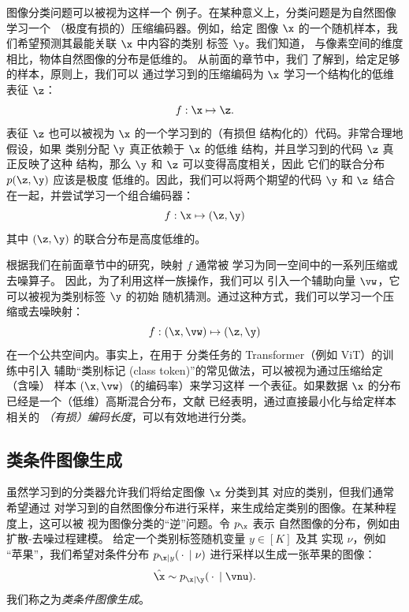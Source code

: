 \documentclass[../../book-main_zh.tex]{subfiles}
\begin{document}
图像分类问题可以被视为这样一个
例子。在某种意义上，分类问题是为自然图像学习一个
（极度有损的）压缩编码器。例如，给定
图像 $\x$ 的一个随机样本，我们希望预测其最能关联 $\x$ 中内容的类别
标签 $\y$。我们知道，
与像素空间的维度相比，物体自然图像的分布是低维的。
从前面的章节中，我们
了解到，给定足够的样本，原则上，我们可以
通过学习到的压缩编码为 $\x$ 学习一个结构化的低维表征 $\z$：
\begin{equation}
    f: \x \mapsto \z.
\end{equation}
表征 $\z$ 也可以被视为 $\x$ 的一个学习到的（有损但
结构化的）代码。非常合理地假设，如果
类别分配 $\y$ 真正依赖于 $\x$ 的低维
结构，并且学习到的代码 $\z$ 真正反映了这种
结构，那么 $\y$ 和 $\z$ 可以变得高度相关，因此
它们的联合分布 $p(\z, \y)$ 应该是极度
低维的。因此，我们可以将两个期望的代码 $\y$
和 $\z$ 结合在一起，并尝试学习一个组合编码器：
\begin{equation}
    f: \x \mapsto (\z, \y)
\end{equation}
其中 $(\z, \y)$ 的联合分布是高度低维的。

根据我们在前面章节中的研究，映射 $f$ 通常被
学习为同一空间中的一系列压缩或去噪算子。
因此，为了利用这样一族操作，我们可以
引入一个辅助向量 $\vw$，它可以被视为类别标签 $\y$ 的初始
随机猜测。通过这种方式，我们可以学习一个压缩或去噪映射：
\begin{equation}\label{eq:classifier-with-class-token}
    f: (\x, \vw) \mapsto (\z, \y)
\end{equation}
在一个公共空间内。事实上，在用于
分类任务的 Transformer（例如 ViT）的训练中引入
辅助“类别标记 (class token)”的常见做法，可以被视为通过压缩给定（含噪）
样本 $(\x, \vw)$（的编码率）来学习这样
一个表征。如果数据 $\x$ 的分布
已经是一个（低维）高斯混合分布，文献
\cite{wright2008classification} 已经表明，通过直接最小化与给定样本相关的
{\em （有损）编码长度}，可以有效地进行分类。

\subsection{类条件图像生成}\label{sub:cfg}
虽然学习到的分类器允许我们将给定图像 $\x$ 分类到其
对应的类别，但我们通常希望通过
对学习到的自然图像分布进行采样，来生成给定类别的图像。在某种程度上，这可以被
视为图像分类的“逆”问题。令 $p_{\x}$ 表示
自然图像的分布，例如由扩散-去噪过程建模。
给定一个类别标签随机变量 $y \in [K]$ 及其
实现 $\nu$，例如
“苹果”，我们希望对条件分布 $p_{\x \mid
y}(\,\cdot\, \mid \nu)$ 进行采样以生成一张苹果的图像：
\begin{equation}
    \hat{\x} \sim p_{\x\mid \y}(\,\cdot\, \mid \vnu).
\end{equation}
我们称之为{\em 类条件图像生成}。
\end{document}
